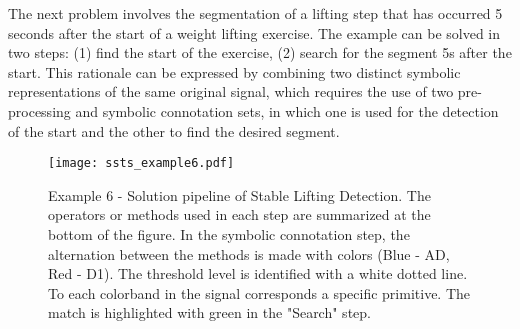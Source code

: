 \par
The next problem involves the segmentation of a lifting step that has occurred 5 seconds after the start of a weight lifting exercise. The example can be solved in two steps: (1) find the start of the exercise, (2) search for the segment 5s after the start. This rationale can be expressed by combining two distinct symbolic representations of the same original signal, which requires the use of two pre-processing and symbolic connotation sets, in which one is used for the detection of the start and the other to find the desired segment.

\begin{figure}[H]
  \centering
      \texttt{[image: ssts\_example6.pdf]}
  \caption{Example 6 - Solution pipeline of Stable Lifting Detection. The operators or methods used in each step are summarized at the bottom of the figure. In the symbolic connotation step, the alternation between the methods is made with colors (Blue - AD, Red - D1). The threshold level is identified with a white dotted line. To each colorband in the signal corresponds a specific primitive. The match is highlighted with green in the "Search" step.}
  \label{fig:Hard}
\end{figure}

